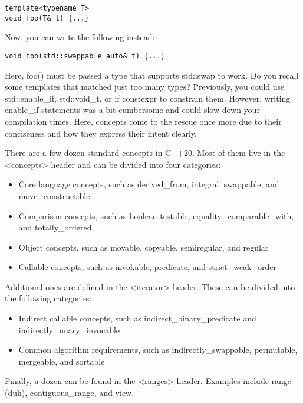 \begin{lstlisting}[style=styleCXX]
template<typename T>
void foo(T& t) {...}
\end{lstlisting}

Now, you can write the following instead:

\begin{lstlisting}[style=styleCXX]
void foo(std::swappable auto& t) {...}
\end{lstlisting}

Here, foo() must be passed a type that supports std::swap to work. Do you recall some templates that matched just too many types? Previously, you could use std::enable\_if, std::void\_t, or if constexpr to constrain them. However, writing enable\_if statements was a bit cumbersome and could slow down your compilation times. Here, concepts come to the rescue once more due to their conciseness and how they express their intent clearly.

There are a few dozen standard concepts in C++20. Most of them live in the <concepts> header and can be divided into four categories:

\begin{itemize}
\item 
Core language concepts, such as derived\_from, integral, swappable, and move\_constructible

\item 
Comparison concepts, such as boolean-testable, equality\_comparable\_with, and totally\_ordered

\item 
Object concepts, such as movable, copyable, semiregular, and regular

\item 
Callable concepts, such as invokable, predicate, and strict\_weak\_order
\end{itemize}

Additional ones are defined in the <iterator> header. These can be divided into the following categories:

\begin{itemize}
\item 
Indirect callable concepts, such as indirect\_binary\_predicate and indirectly\_unary\_invocable

\item 
Common algorithm requirements, such as indirectly\_swappable, permutable, mergeable, and sortable
\end{itemize}

Finally, a dozen can be found in the <ranges> header. Examples include range (duh), contiguous\_range, and view.

